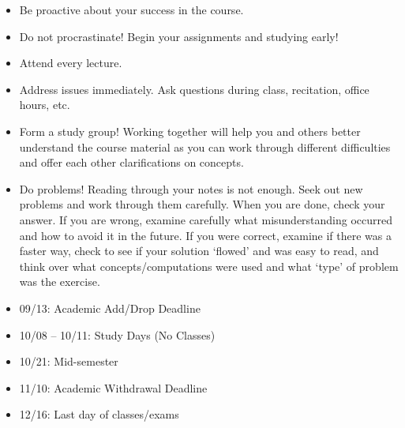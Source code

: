 \documentclass[11pt,letterpaper]{article}
\begin{document}
\begin{itemize} \itemsep=0.3ex
\item Be proactive about your success in the course.
\item Do not procrastinate! Begin your assignments and studying early!
\item Attend every lecture.
\item Address issues immediately. Ask questions during class, recitation, office hours, etc. 
\item Form a study group! Working together will help you and others better understand the course material as you can work through different difficulties and offer each other clarifications on concepts.
\item Do problems! Reading through your notes is not enough. Seek out new problems and work through them carefully. When you are done, check your answer. If you are wrong, examine carefully what misunderstanding occurred and how to avoid it in the future. If you were correct, examine if there was a faster way, check to see if your solution `flowed' and was easy to read, and think over what concepts/computations were used and what `type' of problem was the exercise.
\end{itemize}
\sectionbreak





\newpage




\begin{itemize} \itemsep=0.3ex
\item 09/13: Academic Add/Drop Deadline
\item 10/08 -- 10/11: Study Days (No Classes)
\item 10/21: Mid-semester
\item 11/10: Academic Withdrawal Deadline
\item 12/16: Last day of classes/exams
\end{itemize}
\sectionbreak







\end{document}
